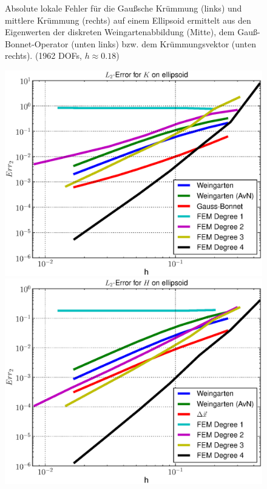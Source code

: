 \begin{figure}
\begin{minipage}[t]{0.49\textwidth}
    \end{minipage}
    \caption[Fehler (Krümmungen auf Ellipsoid)]
            {Absolute lokale Fehler für die Gaußsche Krümmung (links) und mittlere Krümmung (rechts) auf
            einem Ellipsoid
             ermittelt aus den Eigenwerten der diskreten Weingartenabbildung (Mitte), dem
             Gauß-Bonnet-Operator (unten links) bzw. dem Krümmungsvektor (unten rechts).
             (1962 DOFs, \( h\approx0.18 \))}
    \label{figErrCurvHeineC}
  \end{figure}

  \begin{figure}
    \begin{minipage}[t]{0.49\textwidth}
       \centering\includegraphics[width=\textwidth]{bilder/Curvature/heineC/ErrKL2.eps}
    \end{minipage}\hfill
    \begin{minipage}[t]{0.49\textwidth}
       \centering\includegraphics[width=\textwidth]{bilder/Curvature/heineC/ErrHL2.eps}

\end{minipage}
\end{figure}
